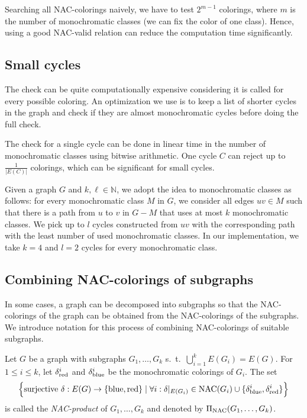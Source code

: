Searching all NAC-colorings naively, we have to test $2^{m-1}$ colorings,
where $m$ is the number of monochromatic classes (we can fix the color of one class).
Hence, using a good NAC-valid relation can reduce the computation time significantly.

\subsection{Small cycles}%
\label{sec:small_cycles}

The check \IsNACColoring{} can be quite computationally expensive
considering it is called for every possible coloring.
An optimization we use is to keep a list of shorter cycles in the graph and
check if they are almost monochromatic cycles before doing the full check.

The check for a single cycle can be done in linear time
in the number of monochromatic classes using bitwise arithmetic.
One cycle $C$ can reject up to $\frac{1}{|E(C)|}$ colorings,
which can be significant for small cycles.

Given a graph $G$ and $k,\ell\in \mathbb{N}$,
we adopt the idea to monochromatic classes as follows:
for every monochromatic class $M$ in $G$,
we consider all edges $uv\in M$ such that there is a path from $u$ to $v$
in $G - M$ that uses at most $k$ monochromatic classes.
We pick up to $l$ cycles constructed from $uv$ with the corresponding
path with the least number of used monochromatic classes.
In our implementation, we take $k=4$ and $l=2$ cycles for every monochromatic class.

\subsection{Combining NAC-colorings of subgraphs}%
\label{sec:combining}

In some cases, a graph can be decomposed into subgraphs so that
the NAC-colorings of the graph can be obtained from the NAC-colorings of the subgraphs.
We introduce notation for this process of combining NAC-colorings of suitable subgraphs.

\begin{definition}
	Let $G$ be a graph with subgraphs $G_1, \dots, G_k$
	s.\ t.\ $\bigcup_{i=1}^k E(G_i) =E(G)$.
	For $1\leq i \leq k$, let $\delta^{i}_{\text{red}}$ and
	$\delta^{i}_{\text{blue}}$ be the monochromatic colorings of $G_i$.
	The set
	\[ \Bigl\{
		\text{surjective }\delta : E(G) \to \{\text{blue}, \text{red}\}
		\mid\forall i : \delta |_{E(G_i)} \in
		\operatorname{NAC}(G_i) \cup \{\delta^{i}_{\text{blue}}, \delta^{i}_{\text{red}}\}
		\Bigr\}
	\]
	is called the \emph{NAC-product} of $G_1, \dots, G_k$ and denoted by $\operatorname{\Pi_{\operatorname{NAC}}}(G_1, \dots, G_k)$.
\end{definition}

